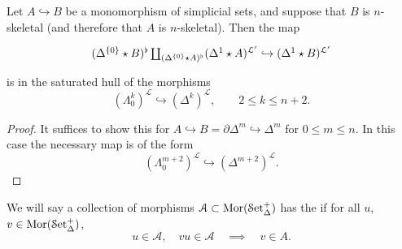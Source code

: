 \documentclass[main.tex]{subfiles}
\begin{document}
\begin{lemma}
  \label{lemma:starred_smash_with_mono}
  Let $A \hookrightarrow B$ be a monomorphism of simplicial sets, and suppose that $B$ is $n$-skeletal (and therefore that $A$ is $n$-skeletal). Then the map
  \begin{equation*}
    \begin{tikzcd}
      (\Delta^{\{0\}} \star B)^{\flat} \coprod_{(\Delta^{\{0\}} \star A)^{\flat}} (\Delta^{1} \star A)^{\mathcal{L}'} \hookrightarrow (\Delta^{1} \star B)^{\mathcal{L}'}
    \end{tikzcd}
  \end{equation*}
  is in the saturated hull of the morphisms
  \begin{equation*}
    (\Lambda^{k}_{0})^{\mathcal{L}} \hookrightarrow (\Delta^{k})^{\mathcal{L}},\qquad 2 \leq k \leq n+2.
  \end{equation*}
\end{lemma}
\begin{proof}
  It suffices to show this for $A \hookrightarrow B = \partial \Delta^{m} \hookrightarrow \Delta^{m}$ for $0 \leq m \leq n$. In this case the necessary map is of the form
  \begin{equation*}
    (\Lambda^{m+2}_{0})^{\mathcal{L}} \hookrightarrow (\Delta^{m+2})^{\mathcal{L}}.
  \end{equation*}
\end{proof}

\begin{definition}
  \label{def:right_cancellation_property}
  We will say a collection of morphisms $\mathcal{A} \subset \mathrm{Mor}(\mathcal{S}\mathrm{et}_{\Delta}^{+})$ has the  if for all $u$, $v \in \mathrm{Mor}(\mathcal{S}\mathrm{et}_{\Delta}^{+})$,
  \begin{equation*}
    u \in \mathcal{A},\quad vu \in \mathcal{A} \quad \implies \quad v \in A.
  \end{equation*}
\end{definition}
\end{document}
